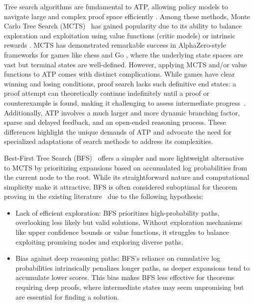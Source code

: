 \documentclass[10pt,english]{article}
\begin{document}
Tree search algorithms are fundamental to ATP, allowing policy models to navigate large and complex proof space efficiently \citep{polu2020generative}. Among these methods, Monte Carlo Tree Search (MCTS)~\citep{mcts} has gained popularity due to its ability to balance exploration and exploitation using value functions (critic models) or intrinsic rewards \citep{browne2012survey, silver2016alphago}. MCTS has demonstrated remarkable success in AlphaZero-style frameworks for games like chess and Go \citep{silver2017mastering}, where the underlying state spaces are vast but terminal states are well-defined. However, applying MCTS and/or value functions to ATP comes with distinct complications. While games have clear winning and losing conditions, proof search lacks such definitive end states: a proof attempt can theoretically continue indefinitely until a proof or counterexample is found, making it challenging to assess intermediate progress~\citep{han2021proofartifact, lample2022hypertree}. Additionally, ATP involves a much larger and more dynamic branching factor, sparse and delayed feedback, and an open-ended reasoning process. These differences highlight the unique demands of ATP and advocate the need for specialized adaptations of search methods to address its complexities.

Best-First Tree Search (BFS)~\citep{bfs} offers a simpler and more lightweight alternative to MCTS by prioritizing expansions based on accumulated log probabilities from the current node to the root. While its straightforward nature and computational simplicity make it attractive, BFS is often considered suboptimal for theorem proving in the existing literature~\citep{intern-prover-v2.5,hunyuanprover,deepseek-proer-v1.5} due to the following hypothesis:

\begin{itemize} 
\item Lack of efficient exploration:
BFS prioritizes high-probability paths, overlooking less likely but valid solutions. Without exploration mechanisms like upper confidence bounds or value functions, it struggles to balance exploiting promising nodes and exploring diverse paths.

\item Bias against deep reasoning paths:
BFS’s reliance on cumulative log probabilities intrinsically penalizes longer paths, as deeper expansions tend to accumulate lower scores. This bias makes BFS less effective for theorems requiring deep proofs, where intermediate states may seem unpromising but are essential for finding a solution.
\end{itemize}
\end{document}
